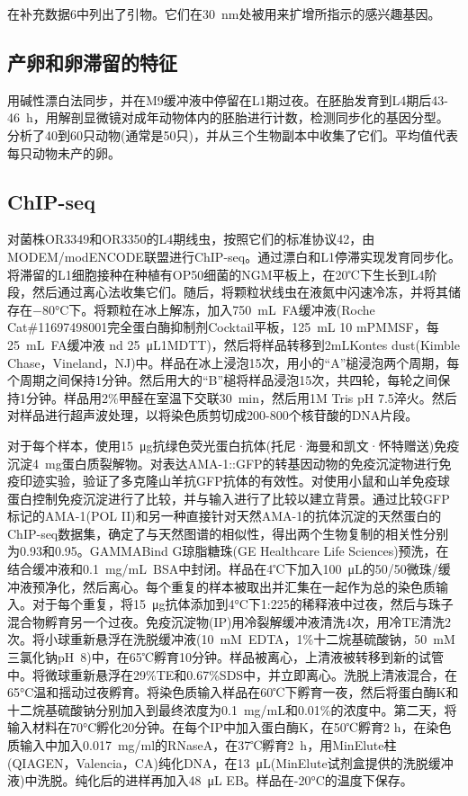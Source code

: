 \documentclass{ctexart}
\begin{document}
        在补充数据6中列出了引物。它们在30~nm处被用来扩增所指示的感兴趣基因。

    \subsection{产卵和卵滞留的特征}

        用碱性漂白法同步，并在M9缓冲液中停留在L1期过夜。在胚胎发育到L4期后43-46~h，用解剖显微镜对成年动物体内的胚胎进行计数，检测同步化的基因分型。分析了40到60只动物(通常是50只)，并从三个生物副本中收集了它们。平均值代表每只动物未产的卵。

    \subsection{ChIP-seq}

        对菌株OR3349和OR3350的L4期线虫，按照它们的标准协议42，由MODEM/modENCODE联盟进行ChIP-seq。通过漂白和L1停滞实现发育同步化。将滞留的L1细胞接种在种植有OP50细菌的NGM平板上，在20℃下生长到L4阶段，然后通过离心法收集它们。随后，将颗粒状线虫在液氮中闪速冷冻，并将其储存在−80°C下。将颗粒在冰上解冻，加入750~mL~FA缓冲液(Roche Cat\#11697498001完全蛋白酶抑制剂Cocktail平板，125~mL 10 mPMMSF，每25~mL~FA缓冲液 nd 25~μL1MDTT)，然后将样品转移到2mLKontes dust(Kimble Chase，Vineland，NJ)中。样品在冰上浸泡15次，用小的“A”槌浸泡两个周期，每个周期之间保持1分钟。然后用大的“B”槌将样品浸泡15次，共四轮，每轮之间保持1分钟。样品用2\%甲醛在室温下交联30~min，然后用1M Tris pH 7.5淬火。然后对样品进行超声波处理，以将染色质剪切成200-800个核苷酸的DNA片段。

        对于每个样本，使用15~μg抗绿色荧光蛋白抗体(托尼·海曼和凯文·怀特赠送)免疫沉淀4~mg蛋白质裂解物。对表达AMA-1::GFP的转基因动物的免疫沉淀物进行免疫印迹实验，验证了多克隆山羊抗GFP抗体的有效性。对使用小鼠和山羊免疫球蛋白控制免疫沉淀进行了比较，并与输入进行了比较以建立背景。通过比较GFP标记的AMA-1(POL II)和另一种直接针对天然AMA-1的抗体沉淀的天然蛋白的ChIP-seq数据集，确定了与天然图谱的相似性，得出两个生物复制的相关性分别为0.93和0.95。GAMMABind G琼脂糖珠(GE Healthcare Life Sciences)预洗，在结合缓冲液和0.1~mg/mL~BSA中封闭。样品在4℃下加入100~μL的50/50微珠/缓冲液预净化，然后离心。每个重复的样本被取出并汇集在一起作为总的染色质输入。对于每个重复，将15~μg抗体添加到4°C下1:225的稀释液中过夜，然后与珠子混合物孵育另一个过夜。免疫沉淀物(IP)用冷裂解缓冲液清洗4次，用冷TE清洗2次。将小球重新悬浮在洗脱缓冲液(10~mM~EDTA，1\%十二烷基硫酸钠，50~mM三氯化钠pH~8)中，在65℃孵育10分钟。样品被离心，上清液被转移到新的试管中。将微球重新悬浮在29\%TE和0.67\%SDS中，并立即离心。洗脱上清液混合，在65°C温和摇动过夜孵育。将染色质输入样品在60℃下孵育一夜，然后将蛋白酶K和十二烷基硫酸钠分别加入到最终浓度为0.1~mg/mL和0.01\%的浓度中。第二天，将输入材料在70°C孵化20分钟。在每个IP中加入蛋白酶K，在50℃孵育2 h，在染色质输入中加入0.017~mg/ml的RNaseA，在37℃孵育2~h，用MinElute柱(QIAGEN，Valencia，CA)纯化DNA，在13~μL(MinElute试剂盒提供的洗脱缓冲液)中洗脱。纯化后的进样再加入48~μL EB。样品在-20°C的温度下保存。
\end{document}
